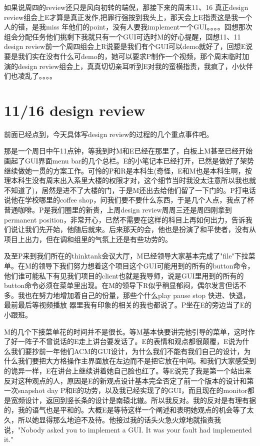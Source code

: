 \documentclass[12pt]{book}
\begin{document}
如果说周四的review还只是风向初转的端倪，那接下来的周末11、16 真正design review组会上E才算是真正发作,把罪行强按到我头上，那天会上E指责这是我一个人的错，是我miss 年他们的point，没有人要我implement一个GUI。。。。回想那次组会分配任务他们挑剩下我就只有一个GUI可选时M的好心提醒，回想11、11 design review前一个周四组会上R说要是我们有个GUI可以demo就好了，回想E说要是我们实在没有什么可demo的，她可以要求P制作一个视频，那个周末临时加演的design review组会上，真真切切亲耳听到E对我的蛮横指责，我疯了，小伙伴们也凌乱了。。。。

\chapter{11/16 design review}
\label{sec-28}
前面已经点到，今天具体写design review的过程的几个重点事件吧。

那是一个周日中午11点钟，等我到时M和E已经在那里了，白板上M甚至已经开始画起了GUI界面menu bar的几个总栏。E的小笔记本已经打开，已然是做好了架势继续做她一贯的方案工作。可怜的P和R是本科生(奇怪，E和M也是本科生啊，按理本科生没有周末出入系里大楼的权限才对，这个细节当时我没太注意所以我也就不知道了)，居然是进不了大楼的门，于是M还出去给他们留了一下门的。P打电话说他在学校哪里的coffee shop，问我们要不要什么东西，于是几个人点，我点了杯普通咖啡。P是我们圈里的新贵，上周design review周周三还是周四刚拿到permanent position，非常开心，已然不需要在这样的科目上再如何出力，告诉我们说让我们先开始，他随后就来。后来那天的会，他也是扮演了和平使者，没有从项目上出力，但在调和组里的气氛上还是有些功劳的。

及至P来到我们所在的thinktank会议大厅，M已经领导大家基本完成了"file"下拉菜单。在M的领导下我们努力想着这个项目这个GUI可能用到的所有的button命令，他们谁可能私下有见我们项目的client也就是我导师，说是GUI里用到的所有的button命令必须在菜单里出现。在M的领导下R似乎稍显郁闷，偶尔发言但话不多。我也在努力地增加着自己的份量，那些个什么play pause stop 快进、快退，最前最后等视频播放 器里我有印象的相关的我也都说了。P坐在E的旁边当了E的小跟班。

M的几个下接菜单花的时间并不是很长。等M基本快要讲完他引导的菜单，这时作了好一阵子不曾说话的E走上讲台要发话了。E的表情和观点都很颠覆，E说为什么我们要抄前一年他们ACM的GUI设计，为什么我们不能有我们自己的设计，为什么我们要把大方格操作主界面放在左边而不是把它放在中间。和我们大家感受到的诡异一样，E在讲台上继续讲着她自己脸也红了。等E说完了我是第一个站出来反对这种观点的人，原因是E的新观点设计基本完全否定了前一个版本的设计和第一次snapshot day P和E的功劳，以及我已经实现了的GUI，而且现在的monitor都是宽频设计，返回到竖长条的设计是南辕北辙。所以我反对。我的反对是有理有据的，我的语气也是平和的。大概E是等待这样一个阐述和表明她观点的机会等了太久，所以她显得那么地迫不及待。他接过我的话头火急火燎地就指责我说，"Nobody asked you to implement a GUI. It was your fault had implemented it."
\end{document}
